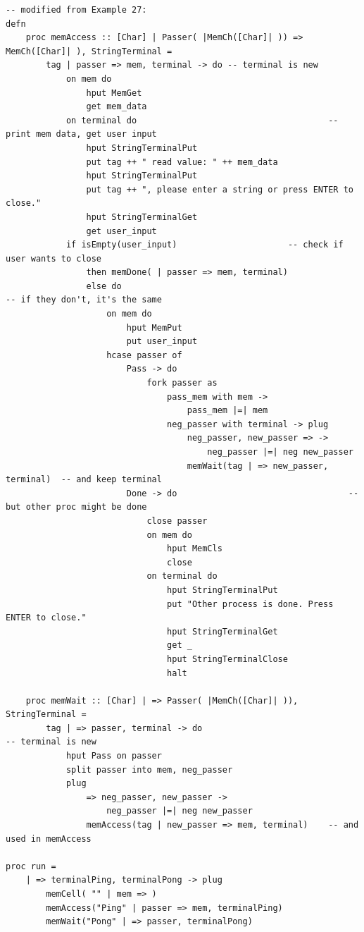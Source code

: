\documentclass[11pt]{article}
\begin{document}
\begin{appendix}
\begin{lstlisting}
-- modified from Example 27:
defn
	proc memAccess :: [Char] | Passer( |MemCh([Char]| )) => MemCh([Char]| ), StringTerminal =
		tag | passer => mem, terminal -> do	-- terminal is new
			on mem do
				hput MemGet
				get mem_data
			on terminal do										-- print mem data, get user input
				hput StringTerminalPut
				put tag ++ " read value: " ++ mem_data
				hput StringTerminalPut
				put tag ++ ", please enter a string or press ENTER to close."
				hput StringTerminalGet
				get user_input
			if isEmpty(user_input)						-- check if user wants to close
				then memDone( | passer => mem, terminal)
				else do													-- if they don't, it's the same
					on mem do
						hput MemPut
						put user_input
					hcase passer of 
						Pass -> do
							fork passer as
								pass_mem with mem -> 
									pass_mem |=| mem
								neg_passer with terminal -> plug
									neg_passer, new_passer => ->		
										neg_passer |=| neg new_passer
									memWait(tag | => new_passer, terminal)	-- and keep terminal
						Done -> do									-- but other proc might be done
							close passer
							on mem do
								hput MemCls
								close
							on terminal do
								hput StringTerminalPut
								put "Other process is done. Press ENTER to close."
								hput StringTerminalGet
								get _
								hput StringTerminalClose
								halt
		
	proc memWait :: [Char] | => Passer( |MemCh([Char]| )), StringTerminal =
		tag | => passer, terminal -> do										-- terminal is new
			hput Pass on passer
			split passer into mem, neg_passer
			plug
				=> neg_passer, new_passer -> 
					neg_passer |=| neg new_passer
				memAccess(tag | new_passer => mem, terminal)	-- and used in memAccess

proc run =
	| => terminalPing, terminalPong -> plug 
		memCell( "" | mem => )
		memAccess("Ping" | passer => mem, terminalPing)
		memWait("Pong" | => passer, terminalPong)
\end{lstlisting}



\end{appendix}
\end{document}
